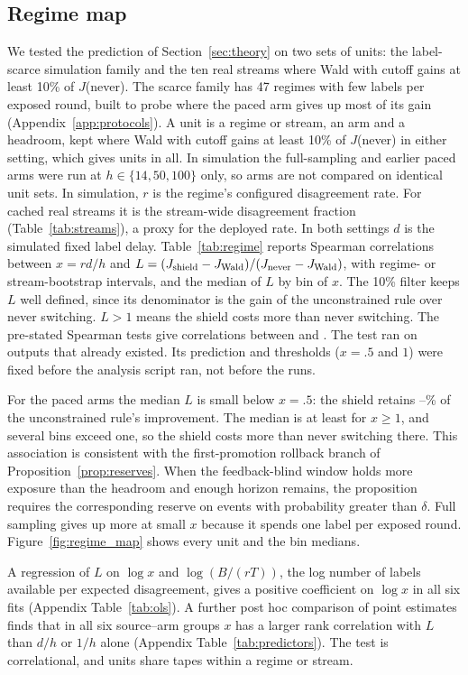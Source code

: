\documentclass[10pt]{article}
\theoremstyle{plain}
\theoremstyle{definition}
\begin{document}
\subsection{Regime map}\label{sec:regimemap}
We tested the prediction of Section~\ref{sec:theory} on two sets of units: the label-scarce simulation family and the ten real streams where Wald with cutoff gains at least 10\% of $J$(never). The scarce family has 47 regimes with few labels per exposed round, built to probe where the paced arm gives up most of its gain (Appendix~\ref{app:protocols}). A unit is a regime or stream, an arm and a headroom, kept where Wald with cutoff gains at least 10\% of $J$(never) in either setting, which gives \NUnits{} units in all. In simulation the full-sampling and earlier paced arms were run at $h\in\{14,50,100\}$ only, so arms are not compared on identical unit sets. In simulation, $r$ is the regime's configured disagreement rate. For cached real streams it is the stream-wide disagreement fraction (Table~\ref{tab:streams}), a proxy for the deployed rate. In both settings $d$ is the simulated fixed label delay. Table~\ref{tab:regime} reports Spearman correlations between $x=rd/h$ and $L=(J_{\rm shield}-J_{\rm Wald})/(J_{\rm never}-J_{\rm Wald})$, with regime- or stream-bootstrap intervals, and the median of $L$ by bin of $x$. The 10\% filter keeps $L$ well defined, since its denominator is the gain of the unconstrained rule over never switching. $L>1$ means the shield costs more than never switching.
The pre-stated Spearman tests give correlations between \SpearLo{} and \SpearHi. The test ran on outputs that already existed. Its prediction and thresholds ($x=.5$ and $1$) were fixed before the analysis script ran, not before the runs.

For the paced arms the median $L$ is small below $x=.5$: the shield retains \KeepLo--\KeepHi\% of the unconstrained rule's improvement. The median is at least \LargeXMin{} for $x\ge1$, and several bins exceed one, so the shield costs more than never switching there. This association is consistent with the first-promotion rollback branch of Proposition~\ref{prop:reserves}. When the feedback-blind window holds more exposure than the headroom and enough horizon remains, the proposition requires the corresponding reserve on events with probability greater than $\delta$. Full sampling gives up more at small $x$ because it spends one label per exposed round. Figure~\ref{fig:regime_map} shows every unit and the bin medians.


A regression of $L$ on $\log x$ and $\log(B/(rT))$, the log number of labels available per expected disagreement, gives a positive coefficient on $\log x$ in all six fits (Appendix Table~\ref{tab:ols}). A further post hoc comparison of point estimates finds that in all six source--arm groups $x$ has a larger rank correlation with $L$ than $d/h$ or $1/h$ alone (Appendix Table~\ref{tab:predictors}). The test is correlational, and units share tapes within a regime or stream.
\end{document}
